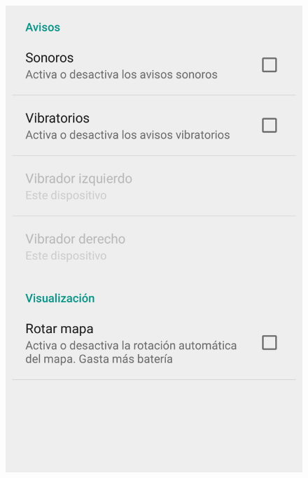 \begin{slide}
  \begin{center}
    \begin{minipage}[b]{0.3\linewidth}
      \begin{center}
        \begin{figure}
          \includegraphics[height=0.65\textheight]{img/naviganto-opciones.png}
        \end{figure}
      \end{center}
    \end{minipage}
    \begin{minipage}[b]{0.3\linewidth}
      \begin{center}
        \begin{figure}

\end{figure}
\end{center}
\end{minipage}
\end{center}
\end{slide}
